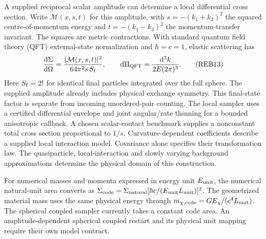 A supplied reciprocal scalar amplitude can determine a local differential
cross section. Write \(\mathcal M(x,s,t)\) for this amplitude, with
\(s=-(k_1+k_2)^2\) the squared centre-of-momentum energy and
\(t=-(k_1-k_3)^2\) the momentum-transfer invariant. The squares are
metric contractions. With standard quantum field theory (QFT)
external-state normalization and
\(\hbar=c=1\), elastic scattering has
\[
 \frac{\mathrm d\Sigma}{\mathrm d\Omega}
   =\frac{|\mathcal M(x,s,t)|^2}{64\pi^2s\,S_{\rm f}},\qquad
 \mathrm d\Pi_{\rm QFT}=\frac{\mathrm d^3k}{2E(2\pi)^3}.
 \tag{REB13}
\]
Here \(S_{\rm f}=2!\) for
identical final particles integrated over the full sphere. The supplied
amplitude already includes physical exchange symmetry. This final-state
factor is separate from incoming unordered-pair counting. The local
sampler uses a certified differential envelope and joint angular/rate
thinning for a bounded anisotropic callback. A chosen scalar-contact
benchmark supplies a nonconstant total cross section proportional to
\(1/s\). Curvature-dependent coefficients describe a supplied local
interaction model. Covariance alone specifies their transformation law.
The quasiparticle, local-interaction and slowly varying background
approximations determine the physical domain of this construction.

For numerical masses and momenta expressed in energy unit \(E_{\rm unit}\),
the numerical natural-unit area converts as
\(\Sigma_{\rm code}=\Sigma_{\rm natural}
[\hbar c/(E_{\rm unit}L_{\rm unit})]^2\).
The geometrized material mass uses the same physical energy through
\(m_{\chi,\rm code}=GE_\chi/(c^4L_{\rm unit})\).
The spherical coupled sampler currently takes a constant code area.
An amplitude-dependent spherical coupled restart and its physical unit
mapping require their own model contract.

